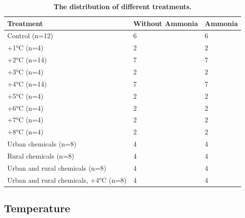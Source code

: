 \begin{table}[H]
    \caption{\bf The distribution of different treatments.}
    \centering
    \begin{tabular}{ |m{6.6cm}<{\centering}|m{3.5cm}<{\centering}|m{3.5cm}<{\centering}| } 
    \hline
     Treatment & Without Ammonia & Ammonia \\
     \hline
     Control (n=12) & 6 & 6 \\ 
     +1°C (n=4) & 2 & 2 \\
     +2°C (n=14) & 7 & 7 \\
     +3°C (n=4) & 2 & 2 \\
     +4°C (n=14) & 7 & 7 \\
     +5°C (n=4) & 2 & 2 \\
     +6°C (n=4) & 2 & 2 \\
     +7°C (n=4) & 2 & 2 \\
     +8°C (n=4) & 2 & 2 \\
     Urban chemicals (n=8) & 4 & 4 \\
     Rural chemicals (n=8) & 4 & 4 \\
     Urban and rural chemicals (n=8) & 4 & 4 \\
     Urban and rural chemicals, +4°C (n=8) & 4 & 4 \\
    \hline
    \end{tabular}    
    \label{tab:Treatment}
\end{table}

\subsection{Temperature}\label{section:temp}

